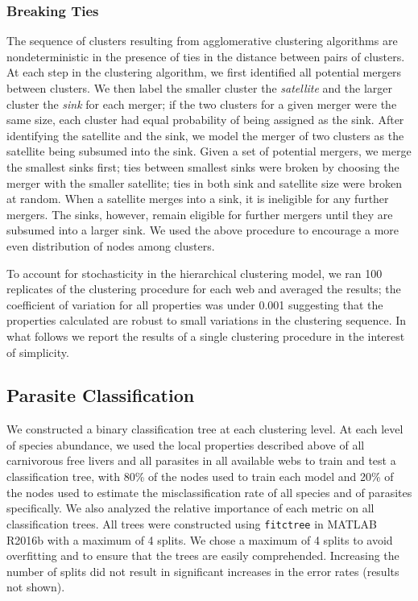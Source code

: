 \documentclass[../dissertation.tex]{subfiles}
\begin{document}
\subsubsection{Breaking Ties} The sequence of clusters resulting from agglomerative clustering
algorithms are nondeterministic in the presence of ties in the distance between
pairs of clusters. At each step in the clustering algorithm, we first
identified all potential mergers between clusters. We then label the smaller
cluster the \textit{satellite} and the larger cluster the \textit{sink} for
each merger; if the two clusters for a given merger were the same size, each
cluster had equal probability of being assigned as the sink. After identifying
the satellite and the sink, we model the merger of two clusters as the
satellite being subsumed into the sink. Given a set of potential mergers, we
merge the smallest sinks first; ties between smallest sinks were broken by
choosing the merger with the smaller satellite; ties in both sink and satellite
size were broken at random. When a satellite merges into a sink, it is
ineligible for any further mergers. The sinks, however, remain eligible for
further mergers until they are subsumed into a larger sink. We used the above
procedure to encourage a more even distribution of nodes among clusters. 

To account for stochasticity in the hierarchical clustering model, we ran 100
replicates of the clustering procedure for each web and averaged the results;
the coefficient of variation for all properties was under 0.001 suggesting that
the properties calculated are robust to small variations in the clustering
sequence. In what follows we report the results of a single clustering
procedure in the interest of simplicity.


\subsection{Parasite Classification} We constructed a binary classification
tree at each clustering level. At each level of species abundance, we used the
local properties described above of all carnivorous free livers and all
parasites in all available webs to train and test a classification tree, with
80\% of the nodes used to train each model and 20\% of the nodes used to
estimate the misclassification rate of all species and of parasites
specifically. We also analyzed the relative importance of each metric on all
classification trees. All trees were constructed using \verb|fitctree| in
MATLAB R2016b with a maximum of 4 splits. We chose a maximum of 4 splits to
avoid overfitting and to ensure that the trees are easily comprehended.
Increasing the number of splits did not result in significant increases in the
error rates (results not shown).
\end{document}
